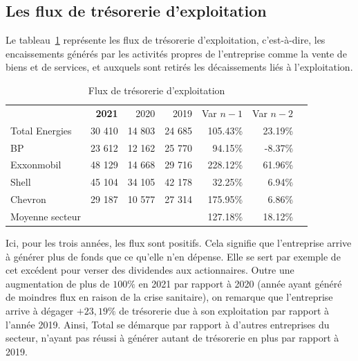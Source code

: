 \documentclass[12pt]{article}
\begin{document}
\subsection{Les flux de trésorerie d'exploitation}
Le tableau~\ref{table:fluxActivite} représente les flux de trésorerie d'exploitation, c'est-à-dire, les encaissements générés par les activités propres de l'entreprise comme la vente de biens et de services, et auxquels sont retirés les décaissements liés à l'exploitation.
\begin{table}[H]
    \sffamily
    \centering
    \caption{Flux de trésorerie d'exploitation}
    \label{table:fluxActivite}
    \begin{tabular}{l*{1}{rrrrrr}}
        \toprule
        ~ & \textbf{2021} & 2020 & 2019 & Var $n-1$ & Var $n-2$ \\
        \cmidrule(r){1-1}\cmidrule(r){2-4}\cmidrule(r){5-6}
        Total Energies & 30 410 & 14 803 & 24 685 & 105.43\% & 23.19\% \\ 
        \cmidrule(r){1-1}\cmidrule(r){2-4}\cmidrule(r){5-6}
        BP & 23 612 & 12 162 & 25 770 & 94.15\% & -8.37\% \\ 
        Exxonmobil & 48 129 & 14 668 & 29 716 & 228.12\% & 61.96\% \\ 
        Shell & 45 104 & 34 105 & 42 178 & 32.25\% & 6.94\% \\ 
        Chevron & 29 187 & 10 577 & 27 314 & 175.95\% & 6.86\% \\ 
        \cmidrule(r){1-1}\cmidrule(r){2-4}\cmidrule(r){5-6}
        Moyenne secteur & ~ & ~ & ~ & 127.18\% & 18.12\% \\
    \bottomrule
    \end{tabular}
\end{table}
Ici, pour les trois années, les flux sont positifs. Cela signifie que l'entreprise arrive à générer plus de fonds que ce qu'elle n'en dépense. Elle se sert par exemple de cet excédent pour verser des dividendes aux actionnaires. Outre une augmentation de plus de $100\%$ en 2021 par rapport à 2020 (année ayant généré de moindres flux en raison de la crise sanitaire), on remarque que l'entreprise arrive à dégager $+23,19\%$ de trésorerie due à son exploitation par rapport à l'année 2019. Ainsi, Total se démarque par rapport à d'autres entreprises du secteur, n'ayant pas réussi à générer autant de trésorerie en plus par rapport à 2019.
\end{document}
